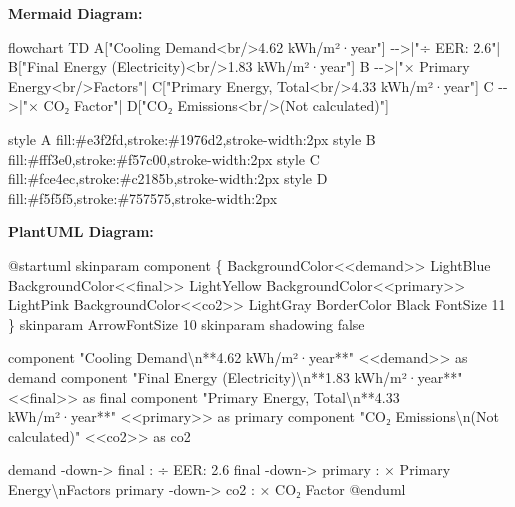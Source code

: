 \documentclass[
  10pt,
  letterpaper,
]{scrbook}
\newenvironment{Shaded}{\begin{snugshade}}{\end{snugshade}}
\newcommand{\NormalTok}[1]{\textcolor[rgb]{0.00,0.23,0.31}{#1}}
\begin{document}
\textbf{Mermaid Diagram:}

\begin{Shaded}
\begin{Highlighting}[]
\NormalTok{flowchart TD}
\NormalTok{    A["Cooling Demand\textless{}br/\textgreater{}4.62 kWh/m²·year"] {-}{-}\textgreater{}|"÷ EER: 2.6"| B["Final Energy (Electricity)\textless{}br/\textgreater{}1.83 kWh/m²·year"]}
\NormalTok{    B {-}{-}\textgreater{}|"× Primary Energy\textless{}br/\textgreater{}Factors"| C["Primary Energy, Total\textless{}br/\textgreater{}4.33 kWh/m²·year"]}
\NormalTok{    C {-}{-}\textgreater{}|"× CO₂ Factor"| D["CO₂ Emissions\textless{}br/\textgreater{}(Not calculated)"]}

\NormalTok{    style A fill:\#e3f2fd,stroke:\#1976d2,stroke{-}width:2px}
\NormalTok{    style B fill:\#fff3e0,stroke:\#f57c00,stroke{-}width:2px}
\NormalTok{    style C fill:\#fce4ec,stroke:\#c2185b,stroke{-}width:2px}
\NormalTok{    style D fill:\#f5f5f5,stroke:\#757575,stroke{-}width:2px}
\end{Highlighting}
\end{Shaded}

\textbf{PlantUML Diagram:}

\begin{Shaded}
\begin{Highlighting}[]
\NormalTok{@startuml}
\NormalTok{skinparam component \{}
\NormalTok{  BackgroundColor\textless{}\textless{}demand\textgreater{}\textgreater{} LightBlue}
\NormalTok{  BackgroundColor\textless{}\textless{}final\textgreater{}\textgreater{} LightYellow}
\NormalTok{  BackgroundColor\textless{}\textless{}primary\textgreater{}\textgreater{} LightPink}
\NormalTok{  BackgroundColor\textless{}\textless{}co2\textgreater{}\textgreater{} LightGray}
\NormalTok{  BorderColor Black}
\NormalTok{  FontSize 11}
\NormalTok{\}}
\NormalTok{skinparam ArrowFontSize 10}
\NormalTok{skinparam shadowing false}

\NormalTok{component "Cooling Demand\textbackslash{}n**4.62 kWh/m²·year**" \textless{}\textless{}demand\textgreater{}\textgreater{} as demand}
\NormalTok{component "Final Energy (Electricity)\textbackslash{}n**1.83 kWh/m²·year**" \textless{}\textless{}final\textgreater{}\textgreater{} as final}
\NormalTok{component "Primary Energy, Total\textbackslash{}n**4.33 kWh/m²·year**" \textless{}\textless{}primary\textgreater{}\textgreater{} as primary}
\NormalTok{component "CO₂ Emissions\textbackslash{}n(Not calculated)" \textless{}\textless{}co2\textgreater{}\textgreater{} as co2}

\NormalTok{demand {-}down{-}\textgreater{} final : ÷ EER: 2.6}
\NormalTok{final {-}down{-}\textgreater{} primary : × Primary Energy\textbackslash{}nFactors}
\NormalTok{primary {-}down{-}\textgreater{} co2 : × CO₂ Factor}
\NormalTok{@enduml}
\end{Highlighting}
\end{Shaded}
\end{document}
